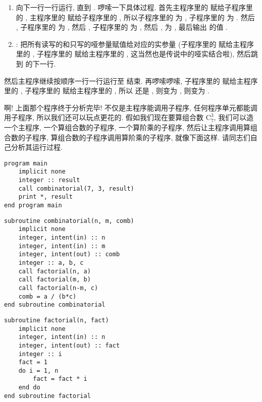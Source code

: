 \begin{enumerate}
\begin{enumerate}
        \item 向下一行一行运行, 直到 . 啰嗦一下具体过程. 首先主程序里的  赋给子程序里的 , 主程序里的  赋给子程序里的 , 所以子程序里的  为 , 子程序里的  为 . 然后 , 子程序里的  为 , 然后 , 子程序里的  为 , 然后 ,  为 , 最后输出  的值 . 
        \item {}: 把所有读写的和只写的哑参量赋值给对应的实参量 (子程序里的  赋给主程序里的 , 子程序里的  赋给主程序里的 , 这当然也是传说中的哑实结合啦), 然后跳到  的下一行. 
    \end{enumerate} 然后主程序继续按顺序一行一行运行至  结束. 再啰嗦啰嗦, 子程序里的  赋给主程序里的 , 子程序里的  赋给主程序里的 , 所以  还是 ,  则变为 ,  则变为 . 
\end{enumerate} 

啊! 上面那个程序终于分析完毕! 不仅是主程序能调用子程序, 任何程序单元都能调用子程序, 所以我们还可以玩点更花的. 假如我们现在要算组合数 $ \text{C} _7^3 $, 我们可以造一个主程序, 一个算组合数的子程序, 一个算阶乘的子程序, 然后让主程序调用算组合数的子程序, 算组合数的子程序调用算阶乘的子程序, 就像下面这样. 请同志们自己分析其运行过程. \label{fact_comb} 
\begin{lstlisting} 
program main
    implicit none
    integer :: result
    call combinatorial(7, 3, result)
    print *, result
end program main
\end{lstlisting}
\begin{lstlisting}
subroutine combinatorial(n, m, comb)
    implicit none
    integer, intent(in) :: n
    integer, intent(in) :: m
    integer, intent(out) :: comb
    integer :: a, b, c
    call factorial(n, a)
    call factorial(m, b)
    call factorial(n-m, c)
    comb = a / (b*c)
end subroutine combinatorial
\end{lstlisting}
\begin{lstlisting}
subroutine factorial(n, fact)
    implicit none
    integer, intent(in) :: n
    integer, intent(out) :: fact
    integer :: i
    fact = 1
    do i = 1, n
        fact = fact * i
    end do
end subroutine factorial
\end{lstlisting} 


